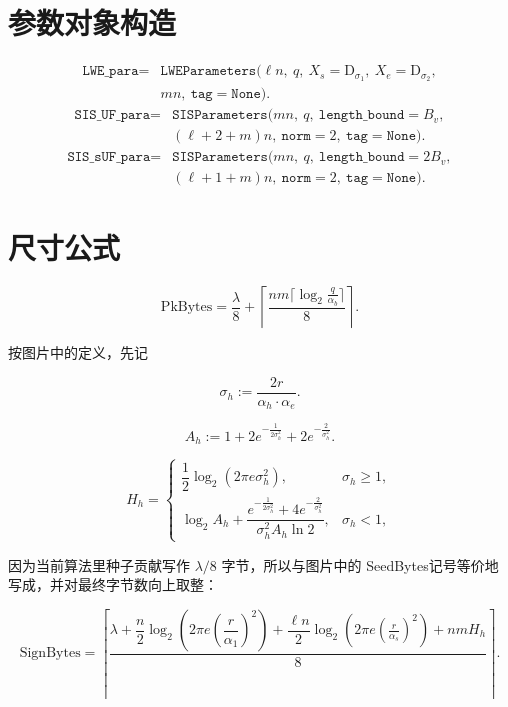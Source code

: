 \documentclass[11pt]{article}
\newcommand{\zh}[1]{{\zhfont #1}}
\begin{document}
\section*{\zh{参数对象构造}}
\[
\begin{aligned}
\texttt{LWE\_para} ={}& \texttt{LWEParameters}(\ell n,\ q,\ X_s=\mathrm{D}_{\sigma_1},\ X_e=\mathrm{D}_{\sigma_2}, \\
& mn,\ \texttt{tag}=\texttt{None}).
\end{aligned}
\]
\[
\begin{aligned}
\texttt{SIS\_UF\_para} ={}& \texttt{SISParameters}(mn,\ q,\ \texttt{length\_bound}=B_v, \\
& (\ell+2+m)n,\ \texttt{norm}=2,\ \texttt{tag}=\texttt{None}).
\end{aligned}
\]
\[
\begin{aligned}
\texttt{SIS\_sUF\_para} ={}& \texttt{SISParameters}(mn,\ q,\ \texttt{length\_bound}=2B_v, \\
& (\ell+1+m)n,\ \texttt{norm}=2,\ \texttt{tag}=\texttt{None}).
\end{aligned}
\]

\section*{\zh{尺寸公式}}
\[
\mathrm{PkBytes} = \frac{\lambda}{8} + \left\lceil\frac{nm\lceil\log_2 \frac{q}{\alpha_b}\rceil}{8}\right\rceil.
\]

{\zhfont 按图片中的定义，先记}

\[
\sigma_h := \frac{2r}{\alpha_h \cdot \alpha_e}.
\]

\[
A_h := 1 + 2e^{-\frac{1}{2\sigma_h^2}} + 2e^{-\frac{2}{\sigma_h^2}}.
\]

\[
H_h=
\begin{cases}
\dfrac12\log_2\!\left(2\pi e\sigma_h^2\right), & \sigma_h\ge 1,\\[0.9em]
\log_2 A_h + \dfrac{e^{-\frac{1}{2\sigma_h^2}} + 4e^{-\frac{2}{\sigma_h^2}}}{\sigma_h^2 A_h \ln 2}, & \sigma_h<1,
\end{cases}
\]

{\zhfont 因为当前算法里种子贡献写作 $\lambda/8$ 字节，所以与图片中的 }SeedBytes{\zhfont 记号等价地写成，并对最终字节数向上取整：}

\[
\mathrm{SignBytes} = \left\lceil \frac{\lambda + \dfrac{n}{2}\log_2\!\left(2\pi e\left(\dfrac{r}{\alpha_1}\right)^2\right) + \dfrac{\ell n}{2}\log_2\!\left(2\pi e (\frac{r}{\alpha_s})^2\right) + nmH_h}{8} \right\rceil.
\]
\end{document}

